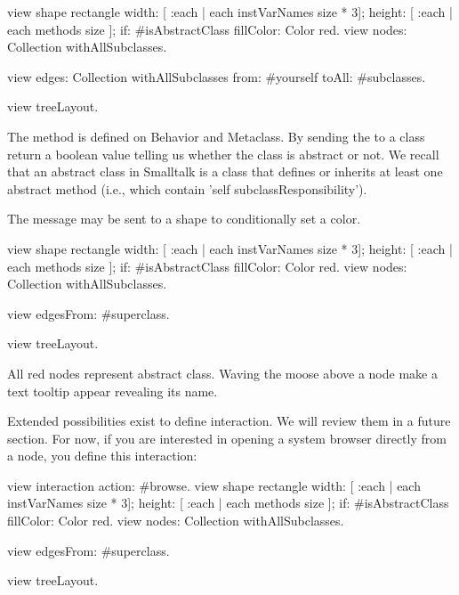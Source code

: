 \documentclass[a4paper,10pt,twoside]{book}
\begin{document}
\begin{code}{}
view shape rectangle
  width: [ :each | each instVarNames size * 3];
  height: [ :each | each methods size ];
  if: #isAbstractClass fillColor: Color red.
view nodes: Collection withAllSubclasses.

view edges: Collection withAllSubclasses from: #yourself toAll: #subclasses.

view treeLayout.
\end{code}

The method  is defined on Behavior and Metaclass. By sending the  to a class return a boolean value telling us whether the class is abstract or not. We recall that an abstract class in Smalltalk is a class that defines or inherits at least one  abstract method (i.e., which contain 'self subclassResponsibility').

The message  may be sent to a shape to conditionally set a color. 

\begin{code}{}
view shape rectangle
  width: [ :each | each instVarNames size * 3];
  height: [ :each | each methods size ];
  if: #isAbstractClass fillColor: Color red.
view nodes: Collection withAllSubclasses.

view edgesFrom: #superclass.

view treeLayout.
\end{code}

All red nodes represent abstract class. Waving the moose above a node make a text tooltip appear revealing its name. 

Extended possibilities exist to define interaction. We will review them in a future section. For now, if you are interested in opening a system browser directly from a node, you define this interaction: 

\begin{code}{}
view interaction action: #browse.
view shape rectangle
  width: [ :each | each instVarNames size * 3];
  height: [ :each | each methods size ];
  if: #isAbstractClass fillColor: Color red.
view nodes: Collection withAllSubclasses.

view edgesFrom: #superclass.

view treeLayout.
\end{code}
\end{document}
